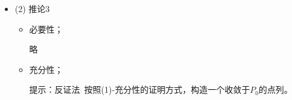 \documentclass{article}
\begin{document}
\begin{itemize}
\begin{itemize}
                取$\delta_1 = 1$，存在$P_1 \in U^{\circ}(P_0; 1) \cap D$，使得
                $|f(P_1) - A| \geq \epsilon_0$，把$P_1$加入$E'$中；

                取$\delta_2 = min\{\frac{1}{2}, \rho(P_0, P_1)\}$，
                存在$P_2 \in U^{\circ}(P_0; \delta_2) \cap D$，使得
                $|f(P_2) - A| \geq \epsilon_0 $，把$P_2$加入$E'$中；

                $\vdots$

                取$\delta_n = min\{\frac{1}{n}, \rho(P_0, P_{n-1})\} $，
                存在$P_n \in U^{\circ}(P_0; \delta_n) \cap D$，使得
                $|f(P_n) - A| \geq \epsilon_0$，把$P_n$加入$E'$中；

                将这个过程无限重复下去，就得到一个$D$的子集$E'$，且$P_0$是$E'$的聚点，
                由构造方式可知，
                \begin{align*}
                  \lim\limits_{\substack{P \to P_0 \\ P \in E'}} f(P) \neq A
                \end{align*}
                出现矛盾。

        \end{itemize}

  \item (2) 推论3

        \begin{itemize}
          \item 必要性；

                略

          \item 充分性；

                提示：反证法$\, $ 按照(1)-充分性的证明方式，构造一个收敛于$P_0$的点列。
        \end{itemize}

\end{itemize}
\end{document}
